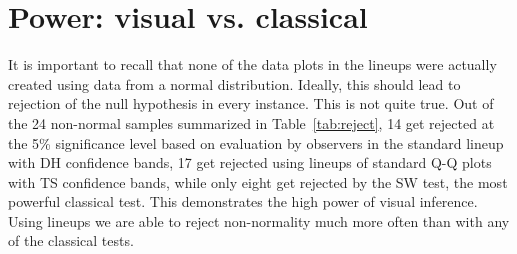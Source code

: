 \documentclass[12pt]{article}\usepackage[]{graphicx}\usepackage[]{color}
\begin{document}






\section{Power: visual vs. classical}\label{sec:power2}

It is important to recall that none of the data plots in the lineups were actually created using data from a normal distribution. Ideally, this should lead to rejection of the null hypothesis in every instance.
This is not quite true. Out of the 24 non-normal samples summarized in Table~\ref{tab:reject}, 14 get rejected at the 5\% significance level based on evaluation by observers in the standard lineup with DH confidence bands, 17 get rejected using lineups of standard Q-Q plots with TS confidence bands, while only eight get rejected by the SW test, the most powerful classical test. This demonstrates the high power  of visual inference. Using lineups we are able to reject non-normality much more often than with any of the classical tests.
\end{document}
